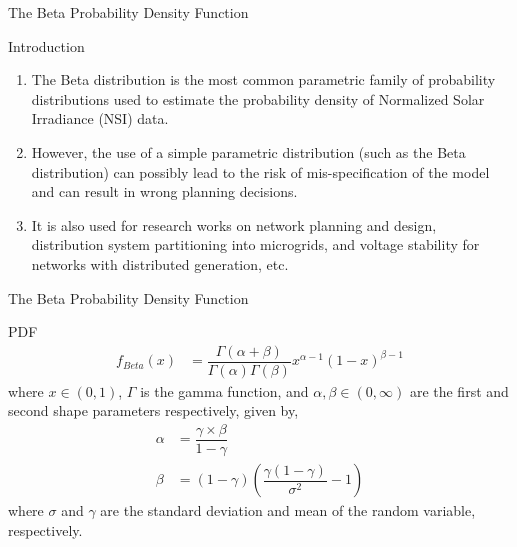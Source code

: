 \documentclass{beamer}
\providecommand{\brak}[1]{\ensuremath{\left(#1\right)}}
\begin{document}
\begin{frame}{The Beta Probability Density Function}
\begin{block}{Introduction}
\begin{enumerate}
    \item The Beta distribution is the most common parametric family of probability distributions used to estimate the probability density of Normalized Solar Irradiance (NSI) data.
    \item However, the use of a simple parametric distribution (such as the Beta distribution) can possibly lead to the risk of mis-specification of the model and can result in wrong planning decisions.
    \item It is also used for research works on network planning and design, distribution system partitioning into microgrids, and voltage stability for networks with distributed generation, etc.
\end{enumerate}
\end{block}
\end{frame}

\begin{frame}{The Beta Probability Density Function}
    \begin{block}{PDF}
\begin{align}
    f_{Beta}(x) &= \dfrac{\Gamma(\alpha + \beta)}{\Gamma(\alpha)\Gamma(\beta)}x^{\alpha-1}(1-x)^{\beta-1}
\end{align}
where $ x\in (0,1)$, $ \Gamma $ is the gamma function, and $ \alpha, \beta \in (0, \infty)$ are the first and second shape parameters respectively, given by,
\begin{align}
    \alpha & = \dfrac{\gamma \times \beta}{1- \gamma} \\
    \beta & = (1- \gamma) \brak{\dfrac{\gamma(1-\gamma)}{\sigma^2}-1}
\end{align}
where $ \sigma$ and $\gamma $ are the standard deviation and mean of the random variable, respectively.
\end{block}
\end{frame}
\end{document}
